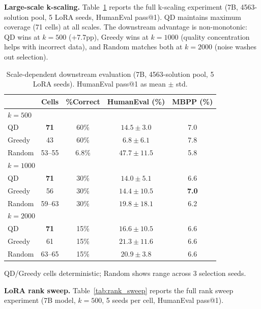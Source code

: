 \documentclass{article}
\theoremstyle{plain}
\theoremstyle{remark}
\begin{document}
\textbf{Large-scale k-scaling.}
Table~\ref{tab:kscale_v10} reports the full k-scaling experiment (7B, 4563-solution pool, 5 LoRA seeds, HumanEval pass@1).
QD maintains maximum coverage (71 cells) at all scales.
The downstream advantage is non-monotonic: QD wins at $k{=}500$ (+7.7pp), Greedy wins at $k{=}1000$ (quality concentration helps with incorrect data), and Random matches both at $k{=}2000$ (noise washes out selection).

\begin{table}[h]
\centering
\caption{Scale-dependent downstream evaluation (7B, 4563-solution pool, 5 LoRA seeds). HumanEval pass@1 as mean $\pm$ std.}
\label{tab:kscale_v10}
\begin{tabular}{lcccc}
\toprule
 & \textbf{Cells} & \textbf{\%Correct} & \textbf{HumanEval (\%)} & \textbf{MBPP (\%)} \\
\midrule
\multicolumn{5}{l}{\textit{$k{=}500$}} \\
QD & \textbf{71} & 60\% & $14.5 \pm 3.0$ & 7.0 \\
Greedy & 43 & 60\% & $6.8 \pm 6.1$ & 7.8 \\
Random & 53--55 & 6.8\% & $\mathbf{47.7 \pm 11.5}$ & 5.8 \\
\midrule
\multicolumn{5}{l}{\textit{$k{=}1000$}} \\
QD & \textbf{71} & 30\% & $14.0 \pm 5.1$ & 6.6 \\
Greedy & 56 & 30\% & $14.4 \pm 10.5$ & \textbf{7.0} \\
Random & 59--63 & 30\% & $\mathbf{19.8 \pm 18.1}$ & 6.2 \\
\midrule
\multicolumn{5}{l}{\textit{$k{=}2000$}} \\
QD & \textbf{71} & 15\% & $16.6 \pm 10.5$ & 6.6 \\
Greedy & 61 & 15\% & $\mathbf{21.3 \pm 11.6}$ & 6.6 \\
Random & 63--65 & 15\% & $20.9 \pm 3.8$ & 6.6 \\
\bottomrule
\end{tabular}
\vspace{1mm}


\end{table}

{\small QD/Greedy cells deterministic; Random shows range across 3 selection seeds.}


\textbf{LoRA rank sweep.}
Table~\ref{tab:rank_sweep} reports the full rank sweep experiment (7B model, $k{=}500$, 5 seeds per cell, HumanEval pass@1).
\end{document}
